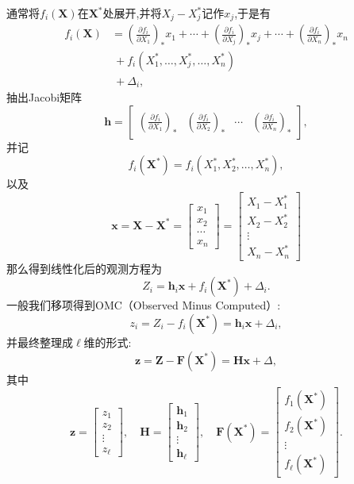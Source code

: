 \documentclass[cn,10pt,citestyle=gb7714-2015,bibstyle=gb7714-2015]{elegantbook}
\renewcommand{\l}{\ell}
\begin{document}
通常将$f_i(\bm{X})$在$\bm{X}^*$处展开,并将$X_j-X_j^*$记作$x_j$,于是有
\begin{align*}
  f_i(\bm{X})&=\left(\frac{\partial f_i}{\partial X_1}\right)_*x_1+\cdots+\left(\frac{\partial f_i}{\partial X_j}\right)_*x_j+\cdots+\left(\frac{\partial f_i}{\partial X_n}\right)_*x_n\\
  &\ +f_i(X_1^*,\ldots,X_j^*,\ldots,X_n^*)\\
  &\ +\varDelta_i,
\end{align*}
抽出\textup{Jacobi}矩阵
\begin{equation}
  \bm{h}=\left[\begin{array}{cccc}
    \left(\frac{\partial f_i}{\partial X_1}\right)_*&\left(\frac{\partial f_i}{\partial X_2}\right)_*&\cdots&\left(\frac{\partial f_i}{\partial X_n}\right)_*
  \end{array}\right],
\end{equation}
并记
\begin{equation}
  f_i(\bm{X}^*)=f_i(X_1^*,X_2^*,\ldots,X_n^*),
\end{equation}
以及
\begin{equation}
  \bm{x}=\bm{X}-\bm{X}^*=\begin{bmatrix}
    x_1\\
    x_2\\
    \cdots\\
    x_n
  \end{bmatrix}=\begin{bmatrix}
    X_1-X_1^*\\
    X_2-X_2^*\\
    \vdots\\
    X_n-X_n^*
  \end{bmatrix}
\end{equation}
那么得到线性化后的观测方程为
\begin{equation}
  Z_i=\bm{h}_i\bm{x}+f_i(\bm{X}^*)+\varDelta_i.
\end{equation}
一般我们移项得到\textup{OMC}（Observed Minus Computed）:
\begin{equation}
  z_i=Z_i-f_i(\bm{X}^*)=\bm{h}_i\bm{x}+\varDelta_i,
\end{equation}
并最终整理成$\l$维的形式:
\begin{equation}
  \bm{z}=\bm{Z}-\bm{F}(\bm{X}^*)=\bm{H}\bm{x}+\bm{\varDelta},
\end{equation}
其中
\[
    \bm{z}=\begin{bmatrix}
      z_1\\
      z_2\\
      \vdots\\
      z_\l
    \end{bmatrix},\quad
    \bm{H}=\begin{bmatrix}
      \bm{h}_1\\
      \bm{h}_2\\
      \vdots\\
      \bm{h}_\l
    \end{bmatrix},\quad
    \bm{F}(\bm{X}^*)=\begin{bmatrix}
      f_1(\bm{X}^*)\\
      f_2(\bm{X}^*)\\
      \vdots\\
      f_\l(\bm{X}^*)
    \end{bmatrix}.
\]
\end{document}
